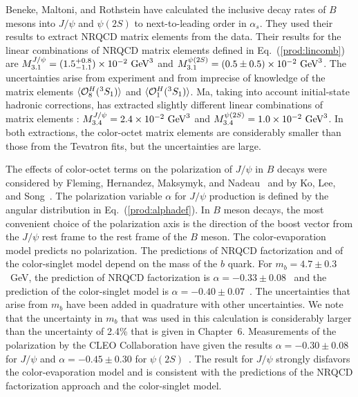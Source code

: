 Beneke, Maltoni, and Rothstein \cite{Beneke:1998ks} have calculated the
inclusive decay rates of $B$ mesons into $J/\psi$ and $\psi(2S)$ to
next-to-leading order in $\alpha_s$. They used their results to
extract NRQCD matrix elements from the data. Their results for the
linear combinations of NRQCD matrix elements defined in
Eq.~(\ref{prod:lincomb}) are $M_{3.1}^{J/\psi}=(1.5_{-1.1}^{+0.8})\times
10^{-2}\hbox{ GeV}^3$ and $M_{3.1}^{\psi(2S)}=(0.5\pm 0.5)\times
10^{-2}\hbox{ GeV}^3$. The uncertainties arise from experiment and from
imprecise of knowledge of the matrix elements $\langle {\cal
O}^H_8({}^3S_1)\rangle$ and $\langle {\cal O}^H_1({}^3S_1)\rangle$. Ma,
taking into account initial-state hadronic corrections, has extracted
slightly different linear combinations of matrix elements
\cite{Ma:2000bz}: $M_{3.4}^{J/\psi}=2.4\times 10^{-2}\hbox{ GeV}^3$ and
$M_{3.4}^{\psi(2S)}=1.0\times 10^{-2}\hbox{ GeV}^3$. In both
extractions, the color-octet matrix elements are considerably smaller
than those from the Tevatron fits, but the uncertainties are large.

The effects of color-octet terms on the polarization of $J/\psi$ in $B$
decays were considered by Fleming, Hernandez, Maksymyk, and
Nadeau~\cite{Fleming:1996pt} and by Ko, Lee, and Song~\cite{Ko:1999zx}.
The polarization variable $\alpha$ for $J/\psi$ production is defined 
by the angular distribution in Eq.~(\ref{prod:alphadef}).
In $B$ meson decays, the most convenient choice of the polarization axis 
is the direction of the boost vector from the $J/\psi$ rest frame 
to the rest frame of the $B$ meson.
The color-evaporation model predicts no polarization.  The predictions of
NRQCD factorization and of the color-singlet model depend on the mass
of the $b$ quark.  For $m_b = 4.7 \pm 0.3$~GeV, the prediction of
NRQCD factorization is $\alpha = -0.33 \pm 0.08$~\cite{Fleming:1996pt}
and the prediction of the color-singlet model is $\alpha = -0.40 \pm
0.07$~\cite{Fleming:1996pt}. The uncertainties that arise from $m_b$
have been added in quadrature with other uncertainties. We note that the 
uncertainty in $m_b$ that was used in this calculation is 
considerably larger than the uncertainty of 2.4\% that is given in 
Chapter~6. Measurements of
the polarization by the CLEO Collaboration have given the results
$\alpha=-0.30\pm 0.08$ for $J/\psi$ and $\alpha=-0.45\pm 0.30$ for
$\psi(2S)$~\cite{Anderson:2002md}. The result for $J/\psi$ strongly
disfavors the color-evaporation model and is consistent with the
predictions of the NRQCD factorization approach and the color-singlet
model.

